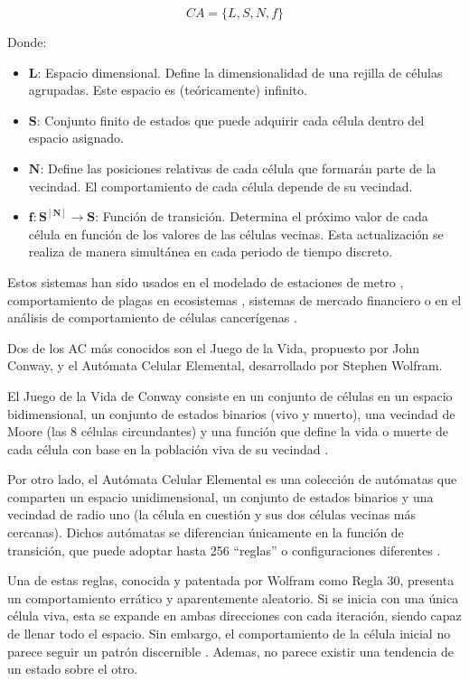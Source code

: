 \documentclass[12pt,twoside]{article}
\begin{document}
	\begin{equation*} CA = \{L, S, N, f\} \end{equation*}
	
	Donde: 
	\begin{itemize} 
		\item $\boldsymbol{L}$: Espacio dimensional. Define la dimensionalidad de una rejilla de células agrupadas. Este espacio es (teóricamente) infinito.

		\item $\boldsymbol{S}$: Conjunto finito de estados que puede adquirir cada célula dentro del espacio asignado.
		
		\item $\boldsymbol{N}$: Define las posiciones relativas de cada célula que formarán parte de la vecindad. El comportamiento de cada célula depende de su vecindad.
		
		\item $\boldsymbol{f : S^{[N]} \rightarrow S}$: Función de transición. Determina el próximo valor de cada célula en función de los valores de las células vecinas. Esta actualización se realiza de manera simultánea en cada periodo de tiempo discreto.
	\end{itemize}
	
	Estos sistemas han sido usados en el modelado de estaciones de metro \cite{b2}, comportamiento de plagas en ecosistemas \cite{b3}, sistemas de mercado financiero \cite{b4} o en el análisis de comportamiento de células cancerígenas \cite{b5}.
	
	Dos de los AC más conocidos son el Juego de la Vida, propuesto por John Conway, y el Autómata Celular Elemental, desarrollado por Stephen Wolfram.
	
	El Juego de la Vida de Conway consiste en un conjunto de células en un espacio bidimensional, un conjunto de estados binarios (vivo y muerto), una vecindad de Moore (las 8 células circundantes) y una función que define la vida o muerte de cada célula con base en la población viva de su vecindad \cite{b6}.
	
	Por otro lado, el Autómata Celular Elemental es una colección de autómatas que comparten un espacio unidimensional, un conjunto de estados binarios y una vecindad de radio uno (la célula en cuestión y sus dos células vecinas más cercanas). Dichos autómatas se diferencian únicamente en la función de transición, que puede adoptar hasta 256 ``reglas'' o configuraciones diferentes \cite{b7}.
	
	Una de estas reglas, conocida y patentada por Wolfram como Regla 30, presenta un comportamiento errático y aparentemente aleatorio. Si se inicia con una única célula viva, esta se expande en ambas direcciones con cada iteración, siendo capaz de llenar todo el espacio. Sin embargo, el comportamiento de la célula inicial no parece seguir un patrón discernible \cite{b8}. Ademas, no parece existir una tendencia de un estado sobre el otro.
	
\end{document}
